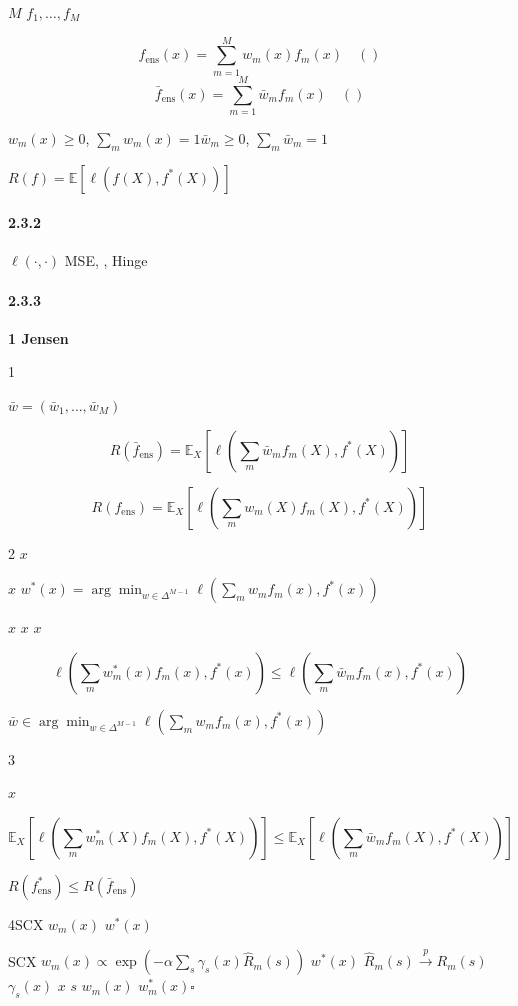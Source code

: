 \documentclass[
  12pt,
]{article}
\begin{document}
 \(M\)  \(f_1, \ldots, f_M\)

\[f_{\text{ens}}(x) = \sum_{m=1}^M w_m(x) f_m(x) \quad (\text{})\]
\[\bar{f}_{\text{ens}}(x) = \sum_{m=1}^M \bar{w}_m f_m(x) \quad (\text{})\]

 \(w_m(x) \geq 0\), \(\sum_m w_m(x) = 1\)\(\bar{w}_m \geq 0\),
\(\sum_m \bar{w}_m = 1\)

 \(R(f) = \mathbb{E}[\ell(f(X), f^*(X))]\)

\paragraph{2.3.2 }\label{ux51f8ux6027ux5047ux8bbe}

 \(\ell(\cdot, \cdot)\) MSE,
, Hinge

\paragraph{2.3.3 }\label{ux8bc1ux660e-2}

\textbf{ 1 Jensen }

 1


\(\bar{w} = (\bar{w}_1, \ldots, \bar{w}_M)\)

\[R(\bar{f}_{\text{ens}}) = \mathbb{E}_X\left[\ell\left(\sum_m \bar{w}_m f_m(X), f^*(X)\right)\right]\]



\[R(f_{\text{ens}}) = \mathbb{E}_X\left[\ell\left(\sum_m w_m(X) f_m(X), f^*(X)\right)\right]\]

 2 \(x\)

 \(x\) 
\(w^*(x) = \arg\min_{w \in \Delta^{M-1}} \ell(\sum_m w_m f_m(x), f^*(x))\)

 \(x\)  \(x\)
 \(x\)

\[\ell\left(\sum_m w_m^*(x) f_m(x), f^*(x)\right) \leq \ell\left(\sum_m \bar{w}_m f_m(x), f^*(x)\right)\]


\(\bar{w} \in \arg\min_{w \in \Delta^{M-1}} \ell(\sum_m w_m f_m(x), f^*(x))\)


 3

 \(x\) 

\[\mathbb{E}_X\left[\ell\left(\sum_m w_m^*(X) f_m(X), f^*(X)\right)\right] \leq \mathbb{E}_X\left[\ell\left(\sum_m \bar{w}_m f_m(X), f^*(X)\right)\right]\]

 \(R(f_{\text{ens}}^*) \leq R(\bar{f}_{\text{ens}})\)

 4SCX  \(w_m(x)\)  \(w^*(x)\) 

SCX 
\(w_m(x) \propto \exp(-\alpha \sum_s \gamma_s(x) \hat{R}_m(s))\)
 \(w^*(x)\)
\(\hat{R}_m(s) \xrightarrow{p} R_m(s)\)  \(\gamma_s(x)\)  \(x\)
 \(s\) \(w_m(x)\) 
\(w_m^*(x)\)\(\square\)
\end{document}
